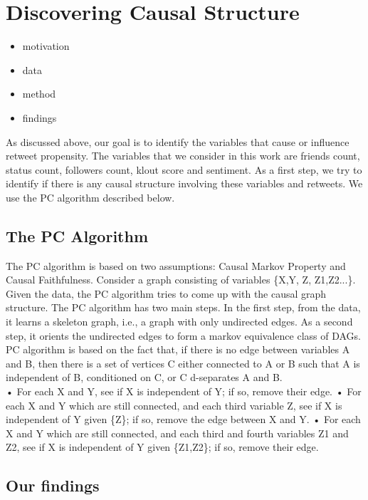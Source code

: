 
\section{Discovering Causal Structure}
\begin{itemize}
\item motivation
\item data
\item method
\item findings
\end{itemize}


As discussed above, our goal is to identify the variables that cause or influence retweet propensity. The variables that we consider in this work are friends count, status count, followers count, klout score and sentiment. As a first step, we try to identify if there is any causal structure involving  these variables and retweets. We use the PC algorithm described below. 
\subsection{The PC Algorithm}
The PC algorithm is based on two assumptions: Causal Markov Property and Causal Faithfulness. Consider a graph consisting of variables \{X,Y, Z, Z1,Z2...\}. Given the data, the PC algorithm tries to come up with the causal graph structure. The PC algorithm has two main steps. In the first step, from the data, it learns a skeleton graph, i.e., a graph with only undirected edges. As a second step, it orients the undirected edges to form a markov equivalence class of DAGs. PC algorithm is based on the fact that, if there is no edge between variables A and B, then there is a set of vertices C either connected to A or B such that A is independent of B, conditioned on C, or C d-separates A and B. \\
• For each X and Y, see if X is independent of Y; if so, remove their edge.
• For each X and Y which are still connected, and each third variable Z, see if
X is independent of Y given \{Z\}; if so, remove the edge between X and Y.
• For each X and Y which are still connected, and each third and fourth variables
Z1 and Z2, see if X is independent of Y given \{Z1,Z2\}; if so, remove their edge.

\subsection{Our findings}

